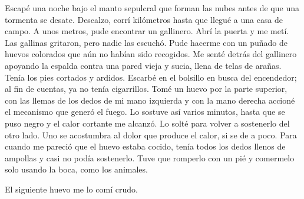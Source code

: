 \documentclass[11pt,twoside,openright,a6paper]{book}
\begin{document}
Escapé una noche bajo el manto sepulcral que forman las nubes antes de que una tormenta se desate. Descalzo, corrí kilómetros hasta que llegué a una casa de campo. A unos metros, pude encontrar un gallinero. Abrí la puerta y me metí. Las gallinas gritaron, pero nadie las escuchó. Pude hacerme con un puñado de huevos colorados que aún no habían sido recogidos. Me senté detrás del gallinero apoyando la espalda contra una pared vieja y sucia, llena de telas de arañas. Tenía los pies cortados y ardidos. Escarbé en el bolsillo en busca del encendedor; al fin de cuentas, ya no tenía cigarrillos. Tomé un huevo por la parte superior, con las llemas de los dedos de mi mano izquierda y con la mano derecha accioné el mecanismo que generó el fuego. Lo sostuve así varios minutos, hasta que se puso negro y el calor cortante me alcanzó. Lo solté para volver a sostenerlo del otro lado. Uno se acostumbra al dolor que produce el calor, si se de a poco. Para cuando me pareció que el huevo estaba cocido, tenía todos los dedos llenos de ampollas y casi no podía sostenerlo. Tuve que romperlo con un pié y comermelo solo usando la boca, como los animales.

El siguiente huevo me lo comí crudo.
\end{document}
